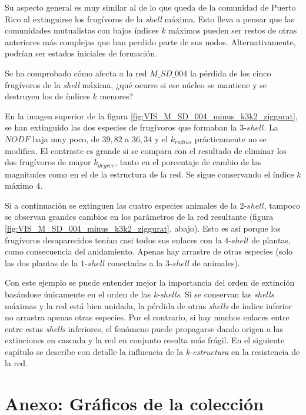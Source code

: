 Su aspecto general es muy similar al de lo que queda de la comunidad de Puerto Rico al extinguirse los frugívoros de la \textit{shell} máxima. Esto lleva a pensar que las comunidades mutualistas con bajos índices $k$ máximos pueden ser restos de otras anteriores más complejas que han perdido parte de sus nodos. Alternativamente, podrían ser estados iniciales de formación.

Se ha comprobado cómo afecta a la red $M\_SD\_004$ la pérdida de los cinco frugívoros de la \textit{shell} máxima, ¿qué ocurre si ese núcleo se mantiene y se destruyen los de índices $k$ menores?

En la imagen superior de la figura \ref{fig:VIS_M_SD_004_minus_k3k2_ziggurat}, se han extinguido las dos especies de frugívoros que formaban la $3$-$shell$. La $NODF$ baja muy poco, de $39,82$ a $36,34$ y el $\overline k_{radius}$ prácticamente no se modifica. El contraste es grande si se compara con el resultado de eliminar los dos frugívoros de mayor $\overline k_{degree}$, tanto en el porcentaje de cambio de las magnitudes como en el de la estructura de la red. Se sigue conservando el índice $k$ máximo $4$.

Si a continuación se extinguen las cuatro especies animales de la $2$-$shell$, tampoco se observan grandes cambios en los parámetros de la red resultante (figura \ref{fig:VIS_M_SD_004_minus_k3k2_ziggurat}, abajo). Esto es así porque los frugívoros desaparecidos tenían casi todos sus enlaces con la $4$-$shell$ de plantas, como consecuencia del anidamiento. Apenas hay arrastre de otras especies (solo las dos plantas de la $1$-$shell$ conectadas a la $3$-$shell$ de animales).

Con este ejemplo se puede entender mejor la importancia del orden de extinción basándose únicamente en el orden de las \textit{k-shells}. Si se conservan las \textit{shells} máximas y la red está bien anidada, la pérdida de otras \textit{shells} de índice inferior no arrastra apenas otras especies. Por el contrario, si hay muchos enlaces entre entre estas \textit{shells} inferiores, el fenómeno puede propagarse dando origen a las extinciones en cascada y la red en conjunto resulta más frágil. En el siguiente capítulo se describe con detalle la influencia de la \textit{k-estructura} en la resistencia de la red.

\clearpage
\section{Anexo: Gráficos de la colección}

